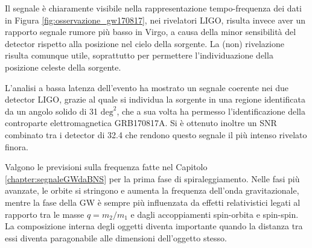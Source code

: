 Il segnale è chiaramente visibile nella rappresentazione tempo-frequenza dei dati in Figura  \ref{fig:osservazione_gw170817}, nei rivelatori LIGO, risulta invece aver un rapporto segnale rumore più basso in Virgo, a causa della minor sensibilità del detector rispetto alla posizione nel cielo della sorgente. La (non) rivelazione risulta comunque utile, soprattutto per permettere l'individuazione della posizione celeste della sorgente.

L'analisi a bassa latenza dell'evento ha mostrato un segnale coerente nei due detector LIGO, grazie al quale si individua la sorgente in una regione identificata da un angolo solido di 31 $\text{deg}^2$, che a sua volta ha permesso l'identificazione della controparte elettromagnetica GRB170817A. 
Si è ottenuto inoltre un SNR combinato tra i detector di 32.4 che rendono questo segnale il più intenso rivelato finora\cite{Abbott_2017a}.

Valgono le previsioni sulla frequenza fatte nel Capitolo \ref{chapter:segnaleGWdaBNS} per la prima fase di spiraleggiamento. Nelle fasi più avanzate, le orbite si stringono e aumenta la frequenza dell'onda gravitazionale, mentre la fase della GW è sempre più influenzata da effetti relativistici legati al rapporto tra le masse $q = m_2/m_1$ e dagli accoppiamenti spin-orbita e spin-spin. La composizione interna degli oggetti diventa importante quando la distanza tra essi diventa paragonabile alle dimensioni dell'oggetto stesso. 

